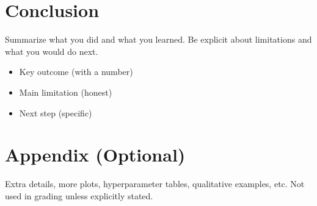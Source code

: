 \documentclass{article}
\begin{document}

\section{Conclusion}
Summarize what you did and what you learned.
Be explicit about limitations and what you would do next.

\begin{itemize}
  \item Key outcome (with a number)
  \item Main limitation (honest)
  \item Next step (specific)
\end{itemize}

{\small


}

\appendix
\newpage
\section{Appendix (Optional)}
Extra details, more plots, hyperparameter tables, qualitative examples, etc.
Not used in grading unless explicitly stated.
\end{document}
